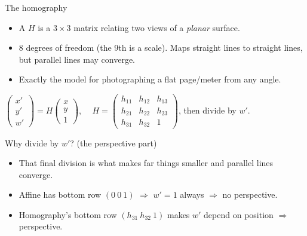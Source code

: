 \documentclass[10pt,aspectratio=169]{beamer}
\begin{document}
\begin{frame}{The homography}
  \begin{itemize}
    \item A  $H$ is a $3\times3$ matrix relating two views of a \emph{planar} surface.
    \item 8 degrees of freedom (the 9th is a scale). Maps straight lines to straight lines, but
          parallel lines may converge.
    \item Exactly the model for photographing a flat page/meter from any angle.
  \end{itemize}
  \begin{mathbox}
    $\begin{pmatrix}x'\\y'\\w'\end{pmatrix} = H\begin{pmatrix}x\\y\\1\end{pmatrix}$,
    $\quad H=\begin{pmatrix}h_{11}&h_{12}&h_{13}\\ h_{21}&h_{22}&h_{23}\\ h_{31}&h_{32}&1\end{pmatrix}$,
    then divide by $w'$.
  \end{mathbox}
\end{frame}

\begin{frame}{Why divide by $w'$? (the perspective part)}
  \begin{itemize}
    \item That final division is what makes far things smaller and parallel lines converge.
    \item Affine has bottom row $(0\ 0\ 1)$ $\Rightarrow$ $w'=1$ always $\Rightarrow$ no perspective.
    \item Homography's bottom row $(h_{31}\ h_{32}\ 1)$ makes $w'$ depend on position $\Rightarrow$ perspective.
  \end{itemize}
\end{frame}
\end{document}
